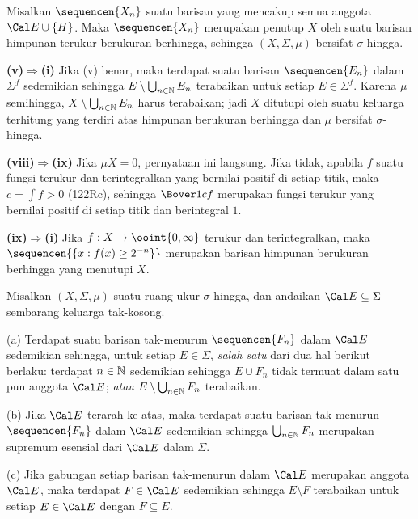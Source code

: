 {Misalkan $\sequencen{X_n}$ suatu barisan yang mencakup semua anggota
$\Cal E\cup\{H\}$. Maka $\sequencen{X_n}$ merupakan penutup $X$ oleh
suatu barisan himpunan terukur berukuran berhingga, sehingga
$(X,\Sigma,\mu)$ bersifat $\sigma$-hingga.

\medskip

{\bf (v)$\Rightarrow$(i)} Jika (v) benar, maka terdapat suatu barisan
$\sequencen{E_n}$ dalam $\Sigma^f$ sedemikian sehingga
$E\setminus\bigcup_{n\in\Bbb N}E_n$ terabaikan untuk setiap
$E\in\Sigma^f$. Karena $\mu$ semihingga,
$X\setminus\bigcup_{n\in\Bbb N}E_n$ harus terabaikan; jadi $X$ ditutupi
oleh suatu keluarga terhitung yang terdiri atas himpunan berukuran berhingga
dan $\mu$ bersifat $\sigma$-hingga.

\medskip

{\bf (viii)$\Rightarrow$(ix)} Jika $\mu X=0$, pernyataan ini langsung.
Jika tidak, apabila $f$ suatu fungsi terukur dan terintegralkan yang bernilai
positif di setiap titik, maka $c=\int f>0$ (122Rc), sehingga $\Bover1cf$
merupakan fungsi terukur yang bernilai positif di setiap titik dan berintegral
$1$.

{\bf (ix)$\Rightarrow$(i)} Jika $f:X\to\ooint{0,\infty}$ terukur dan
terintegralkan, maka
$\sequencen{\{x:f(x)\ge 2^{-n}\}}$ merupakan barisan himpunan berukuran
berhingga yang menutupi $X$.
}%

 Misalkan $(X,\Sigma,\mu)$ suatu ruang ukur
$\sigma$-hingga, dan andaikan $\Cal E\subseteq\Sigma$ sembarang keluarga
tak-kosong.

(a) Terdapat suatu barisan tak-menurun $\sequencen{F_n}$ dalam $\Cal E$
sedemikian sehingga, untuk setiap $E\in\Sigma$, {\it salah satu} dari
dua hal berikut berlaku: terdapat $n\in\Bbb N$ sedemikian sehingga
$E\cup F_n$ tidak termuat dalam satu pun anggota $\Cal E$; {\it atau}
$E\setminus\bigcup_{n\in\Bbb N}F_n$ terabaikan.

(b) Jika $\Cal E$ terarah ke atas, maka terdapat suatu barisan tak-menurun
$\sequencen{F_n}$ dalam $\Cal E$ sedemikian sehingga
$\bigcup_{n\in\Bbb N}F_n$ merupakan supremum esensial dari $\Cal E$
dalam $\Sigma$.

(c) Jika gabungan setiap barisan tak-menurun dalam $\Cal E$ merupakan anggota
$\Cal E$, maka terdapat $F\in\Cal E$ sedemikian sehingga
$E\setminus F$ terabaikan untuk setiap $E\in\Cal E$ dengan $F\subseteq E$.


